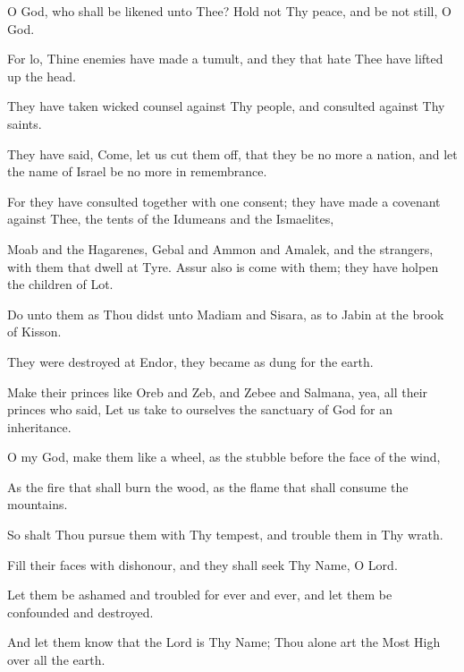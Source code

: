 O God, who shall be likened unto Thee? Hold not Thy peace, and be not still, O God.

For lo, Thine enemies have made a tumult, and they that hate Thee have lifted up the head.

They have taken wicked counsel against Thy people, and consulted against Thy saints.

They have said, Come, let us cut them off, that they be no more a nation, and let the name of Israel be no more in remembrance.

For they have consulted together with one consent; they have made a covenant against Thee, the tents of the Idumeans and the Ismaelites,

Moab and the Hagarenes, Gebal and Ammon and Amalek, and the strangers, with them that dwell at Tyre. Assur also is come with them; they have holpen the children of Lot.

Do unto them as Thou didst unto Madiam and Sisara, as to Jabin at the brook of Kisson.

They were destroyed at Endor, they became as dung for the earth.

Make their princes like Oreb and Zeb, and Zebee and Salmana, yea, all their princes who said, Let us take to ourselves the sanctuary of God for an inheritance.

O my God, make them like a wheel, as the stubble before the face of the wind,

As the fire that shall burn the wood, as the flame that shall consume the mountains.

So shalt Thou pursue them with Thy tempest, and trouble them in Thy wrath.

Fill their faces with dishonour, and they shall seek Thy Name, O Lord.

Let them be ashamed and troubled for ever and ever, and let them be confounded and destroyed.

And let them know that the Lord is Thy Name; Thou alone art the Most High over all the earth.
